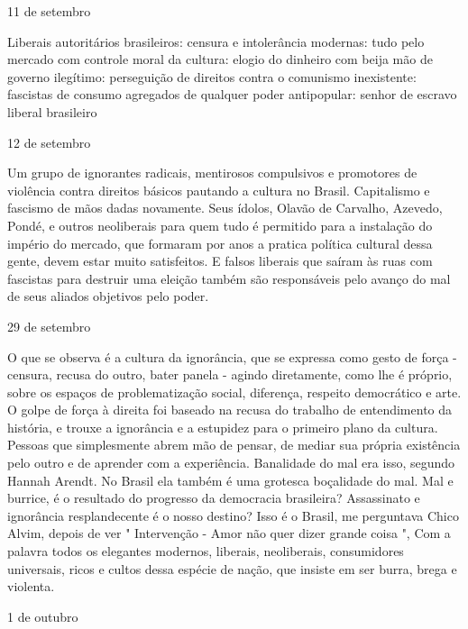 11 de setembro

Liberais autoritários brasileiros: censura e intolerância modernas: tudo
pelo mercado com controle moral da cultura: elogio do dinheiro com beija
mão de governo ilegítimo: perseguição de direitos contra o comunismo
inexistente: fascistas de consumo agregados de qualquer poder
antipopular: senhor de escravo liberal brasileiro

12 de setembro

Um grupo de ignorantes radicais, mentirosos compulsivos e promotores de
violência contra direitos básicos pautando a cultura no Brasil.
Capitalismo e fascismo de mãos dadas novamente. Seus ídolos, Olavão de
Carvalho, Azevedo, Pondé, e outros neoliberais para quem tudo é
permitido para a instalação do império do mercado, que formaram por anos
a pratica política cultural dessa gente, devem estar muito satisfeitos.
E falsos liberais que saíram às ruas com fascistas para destruir uma
eleição também são responsáveis pelo avanço do mal de seus aliados
objetivos pelo poder.

29 de setembro

O que se observa é a cultura da ignorância, que se expressa como gesto
de força - censura, recusa do outro, bater panela - agindo diretamente,
como lhe é próprio, sobre os espaços de problematização social,
diferença, respeito democrático e arte. O golpe de força à direita foi
baseado na recusa do trabalho de entendimento da história, e trouxe a
ignorância e a estupidez para o primeiro plano da cultura. Pessoas que
simplesmente abrem mão de pensar, de mediar sua própria existência pelo
outro e de aprender com a experiência. Banalidade do mal era isso,
segundo Hannah Arendt. No Brasil ela também é uma grotesca boçalidade do
mal. Mal e burrice, é o resultado do progresso da democracia brasileira?
Assassinato e ignorância resplandecente é o nosso destino? Isso é o
Brasil, me perguntava Chico Alvim, depois de ver " Intervenção - Amor
não quer dizer grande coisa ", Com a palavra todos os elegantes
modernos, liberais, neoliberais, consumidores universais, ricos e cultos
dessa espécie de nação, que insiste em ser burra, brega e violenta.

1 de outubro

